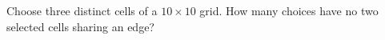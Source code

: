 Choose three distinct cells of a $10\times10$ grid. How many choices have no two selected cells sharing an edge?
